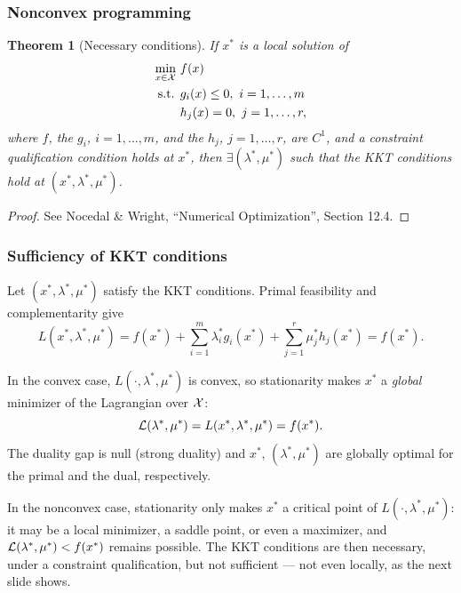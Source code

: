 \documentclass[usepdftitle=false,aspectratio=169]{beamer}
\newtheorem{thm}{Theorem}
\def\red{\color{red}}
\begin{document}
\begin{frame}
\frametitle{Nonconvex programming}

\begin{thm}[Necessary conditions]
If $x^*$ is a local solution of
\begin{align*}
\min_{x \in {\mathcal{X}}} \ & f(x) \\
\mbox{s.t. } & g_i(x) \leq 0,\ i = 1,\ldots,m \\
& h_j(x) = 0,\ j = 1,\ldots,r,
\end{align*}
where $f$, the $g_i$, $i = 1,\ldots,m$, and the $h_j$, $j = 1,\ldots,r$, are $C^1$, and a constraint qualification condition holds at $x^*$, then
$\exists (\lambda^*, \mu^*)$ such that the KKT conditions hold at $(x^*,\lambda^*, \mu^*)$.
\end{thm}

\begin{proof}
See Nocedal \& Wright, ``Numerical Optimization'', Section 12.4.
\end{proof}

\end{frame}

\begin{frame}
	\frametitle{Sufficiency of KKT conditions}
	\small
	
	Let $(x^*, \lambda^*, \mu^*)$ satisfy the KKT conditions.
	Primal feasibility and complementarity give
	$$
	L(x^*, \lambda^*, \mu^*) = f(x^*) + \sum_{i = 1}^m \lambda_i^* g_i(x^*) + \sum_{j = 1}^r \mu_j^* h_j(x^*) = f(x^*).
	$$
	
	\mbox{}
	
	{\red In the convex case}, $L(\cdot, \lambda^*, \mu^*)$ is convex, so stationarity makes $x^*$ a {\it global} minimizer of the Lagrangian over ${\mathcal{X}}$:
	$$
	{\mathcal{L}}(\lambda^*, \mu^*) = L(x^*, \lambda^*, \mu^*) = f(x^*).
	$$
	The duality gap is null ({\red strong duality}) and $x^*$, $(\lambda^*, \mu^*)$ are globally optimal for the primal and the dual, respectively.

	\mbox{}

	{\red In the nonconvex case}, stationarity only makes $x^*$ a critical point of $L(\cdot, \lambda^*, \mu^*)$: it may be a local minimizer, a saddle point, or even a maximizer, and ${\mathcal{L}}(\lambda^*, \mu^*) < f(x^*)$ remains possible.
	The KKT conditions are then necessary, under a constraint qualification, but not sufficient --- not even locally, as the next slide shows.
	
	
\end{frame}
\end{document}
